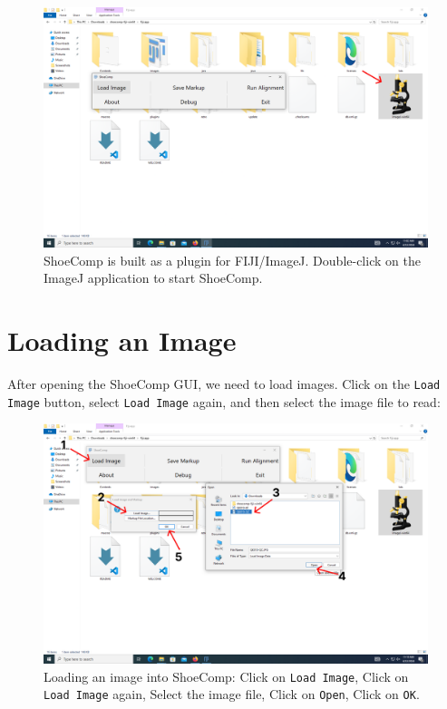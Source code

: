 \documentclass{csafedoc}
\begin{document}
\begin{figure}[H]
	\begin{center}
		\includegraphics[width=0.8\linewidth]{images/step_3-anno.png}
	\end{center}
	\caption{ShoeComp is built as a plugin for FIJI/ImageJ. Double-click on the ImageJ application to start
		ShoeComp.}
	\label{fig:step3}
\end{figure}

\section{Loading an Image}

After opening the ShoeComp GUI, we need to load images. Click on the \texttt{Load Image}
button, select \texttt{Load Image} again, and then select the image file to read:

\begin{figure}[H]
	\begin{center}
		\includegraphics[width=0.8\linewidth]{images/step_4a-anno.png}
	\end{center}
	\caption{Loading an image into ShoeComp: Click on \texttt{Load Image}, Click on
		\texttt{Load Image} again, Select the image file, Click on \texttt{Open}, Click on \texttt{OK}.}
	\label{fig:step4a}
\end{figure}
\end{document}
